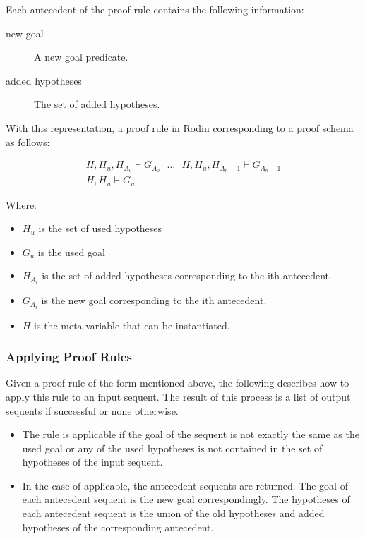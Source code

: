 Each antecedent of the proof rule contains the following information:

\begin{description}
	\item[new goal] A new goal predicate. 
	\item[added hypotheses] The set of added hypotheses. 
\end{description}

With this representation, a proof rule in Rodin corresponding to a proof schema as follows: 

$$\begin{array}{c} H, H_u, H_{A_0} \vdash G_{A_0} ~~~\ldots~~~ H, H_u, H_{A_n-1} \vdash G_{A_n-1} \\ \hline H, H_u \vdash G_u \end{array} $$

Where:
\begin{itemize}
	\item     $H_u$ is the set of used hypotheses 
	\item     $G_u$ is the used goal 
	\item     $H_{A_i}$ is the set of added hypotheses corresponding to the ith antecedent. 
	\item     $G_{A_i}$ is the new goal corresponding to the ith antecedent. 
	\item     $H$ is the meta-variable that can be instantiated. 
\end{itemize}

\subsubsection{Applying Proof Rules}

Given a proof rule of the form mentioned above, the following describes how to apply this rule to an input sequent. The result of this process is a list of output sequents if successful or none otherwise.

\begin{itemize}
	\item The rule is applicable if the goal of the sequent is not exactly the same as the used goal or any of the used hypotheses is not contained in the set of hypotheses of the input sequent. 
	\item In the case of applicable, the antecedent sequents are returned. The goal of each antecedent sequent is the new goal correspondingly. The hypotheses of each antecedent sequent is the union of the old hypotheses and added hypotheses of the corresponding antecedent. 
\end{itemize}

